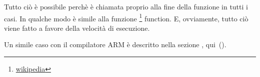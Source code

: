 \newcommand{\URLSJ}{\href{http://en.wikipedia.org/wiki/Setjmp.h}{wikipedia}}

Tutto ciò è possibile perchè \printf è chiamata proprio alla fine della funzione \ttf in tutti i casi.
In qualche modo è simile alla funzione \footnote{\URLSJ} function.
E, ovviamente, tutto ciò viene fatto a favore della velocità di esecuzione.

Un simile caso con il compilatore ARM è descritto nella sezione \q{\PrintfSeveralArgumentsSectionName}, qui~().



